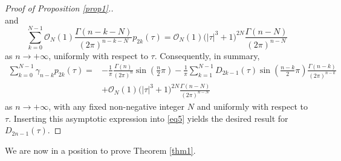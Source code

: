 \documentclass[11pt]{article}
\numberwithin{equation}{section}
\numberwithin{equation}{section}
\begin{document}
\begin{proof}[Proof of Proposition \ref{prop1}.]
\[\]
and
\[
\sum_{k = 0}^{N - 1} \mathcal{O}_N(1) \frac{\Gamma (n - k - N)}{(2\pi )^{n - k - N} }p_{2k} (\tau )=\mathcal{O}_N (1)\bigl(\left| \tau \right|^3 + 1\bigr)^{2N} \frac{\Gamma (n - N)}{(2\pi )^{n - N}}
\]
as $n\to+\infty$, uniformly with respect to $\tau$. Consequently, in summary,
\begin{align*}
\sum_{k = 0}^{N - 1} \gamma _{n - k} p_{2k} (\tau ) ={}& -\frac{1}{\pi}\frac{\Gamma (n)}{(2\pi )^n } \sin \left( \frac{n}{2}\pi \right) -\frac{1}{\pi}\sum_{k = 1}^{N - 1} D_{2k - 1} (\tau )\sin \left( \frac{n - k}{2}\pi \right)\frac{\Gamma (n - k)}{(2\pi )^{n - k}} \\ & +\mathcal{O}_N (1)\bigl(\left| \tau \right|^3 + 1\bigr)^{2N} \frac{\Gamma (n - N)}{(2\pi )^{n - N}}
\end{align*}
as $n\to+\infty$, with any fixed non-negative integer $N$ and uniformly with respect to $\tau$. Inserting this asymptotic expression into \eqref{eq5} yields the desired result for $D_{2n - 1} (\tau )$.
\end{proof}

We are now in a position to prove Theorem \ref{thm1}.
\end{document}
